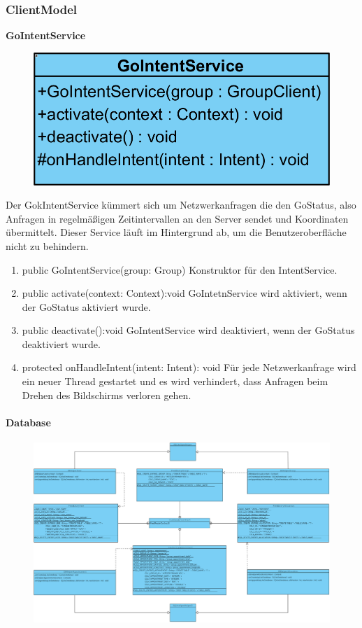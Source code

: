 \subsubsection{ClientModel}

\textbf{GoIntentService}
\begin{figure}[H]
	\includegraphics[scale = .3]{res/umlClasses/GoIntentService.png}
	\centering	
\end{figure}
Der GokIntentService kümmert sich um Netzwerkanfragen die den GoStatus, also Anfragen in regelmäßigen Zeitintervallen an den Server sendet und Koordinaten übermittelt. Dieser Service läuft im Hintergrund ab, um die Benutzeroberfläche nicht zu behindern.
\begin{enumerate}
	\item public GoIntentService(group: Group)
		Konstruktor für den IntentService.
	\item public activate(context: Context):void
		GoIntetnService wird aktiviert, wenn der GoStatus aktiviert wurde.
	\item public deactivate():void
		GoIntentService wird deaktiviert, wenn der GoStatus deaktiviert wurde.
	\item protected onHandleIntent(intent: Intent): void
		Für jede Netzwerkanfrage wird ein neuer Thread gestartet und es wird verhindert, dass Anfragen beim Drehen des Bildschirms verloren gehen.
\end{enumerate}

\paragraph{Database}
\begin{figure}[H]
	\includegraphics[scale = .3]{res/umlDiagramms/modelClientDatabase.pdf}
	\centering	
\end{figure}


